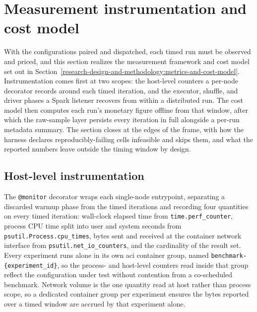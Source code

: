 \section{Measurement instrumentation and cost model}
\label{system-architecture-and-implementation:measurement-instrumentation-and-cost-model}

With the configurations paired and dispatched, each timed run must be observed and priced, and this section realizes the measurement framework and cost model set out in Section~\ref{research-design-and-methodology:metrics-and-cost-model}. Instrumentation comes first at two scopes: the host-level counters a per-node decorator records around each timed iteration, and the executor, shuffle, and driver phases a Spark listener recovers from within a distributed run. The cost model then computes each run's monetary figure offline from that window, after which the raw-sample layer persists every iteration in full alongside a per-run metadata summary. The section closes at the edges of the frame, with how the harness declares reproducibly-failing cells infeasible and skips them, and what the reported numbers leave outside the timing window by design.

\subsection{Host-level instrumentation}
\label{system-architecture-and-implementation:measurement-instrumentation-and-cost-model:host-level-instrumentation}

The \texttt{@monitor} decorator wraps each single-node entrypoint, separating a discarded warmup phase from the timed iterations and recording four quantities on every timed iteration: wall-clock elapsed time from \texttt{time.perf\_counter}, process CPU time split into user and system seconds from \texttt{psutil.Process.cpu\_times}, bytes sent and received at the container network interface from \texttt{psutil.net\_io\_counters}, and the cardinality of the result set. Every experiment runs alone in its own \acrshort{aci} container group, named \texttt{benchmark-\{experiment\_id\}}, so the process- and host-level counters read inside that group reflect the configuration under test without contention from a co-scheduled benchmark. Network volume is the one quantity read at host rather than process scope, so a dedicated container group per experiment ensures the bytes reported over a timed window are accrued by that experiment alone.

